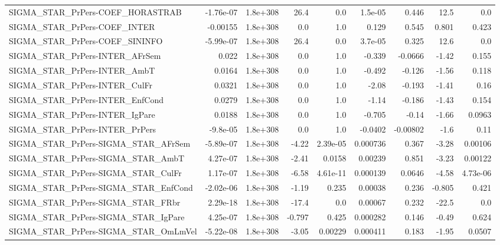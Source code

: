 \begin{tabular}{lrrrrrrrr}
SIGMA\_STAR\_PrPers-COEF\_HORASTRAB      &   -1.76e-07 &     1.8e+308 &    26.4 &      0.0 &    1.5e-05 &       0.446 &         12.5 &           0.0 \\
SIGMA\_STAR\_PrPers-COEF\_INTER          &    -0.00155 &     1.8e+308 &     0.0 &      1.0 &      0.129 &       0.545 &        0.801 &         0.423 \\
SIGMA\_STAR\_PrPers-COEF\_SININFO        &   -5.99e-07 &     1.8e+308 &    26.4 &      0.0 &    3.7e-05 &       0.325 &         12.6 &           0.0 \\
SIGMA\_STAR\_PrPers-INTER\_AFrSem        &       0.022 &     1.8e+308 &     0.0 &      1.0 &     -0.339 &     -0.0666 &        -1.42 &         0.155 \\
SIGMA\_STAR\_PrPers-INTER\_AmbT          &      0.0164 &     1.8e+308 &     0.0 &      1.0 &     -0.492 &      -0.126 &        -1.56 &         0.118 \\
SIGMA\_STAR\_PrPers-INTER\_CulFr         &      0.0321 &     1.8e+308 &     0.0 &      1.0 &      -2.08 &      -0.193 &        -1.41 &          0.16 \\
SIGMA\_STAR\_PrPers-INTER\_EnfCond       &      0.0279 &     1.8e+308 &     0.0 &      1.0 &      -1.14 &      -0.186 &        -1.43 &         0.154 \\
SIGMA\_STAR\_PrPers-INTER\_IgPare        &      0.0188 &     1.8e+308 &     0.0 &      1.0 &     -0.705 &       -0.14 &        -1.66 &        0.0963 \\
SIGMA\_STAR\_PrPers-INTER\_PrPers        &    -9.8e-05 &     1.8e+308 &     0.0 &      1.0 &    -0.0402 &    -0.00802 &         -1.6 &          0.11 \\
SIGMA\_STAR\_PrPers-SIGMA\_STAR\_AFrSem   &   -5.89e-07 &     1.8e+308 &   -4.22 & 2.39e-05 &   0.000736 &       0.367 &        -3.28 &       0.00106 \\
SIGMA\_STAR\_PrPers-SIGMA\_STAR\_AmbT     &    4.27e-07 &     1.8e+308 &   -2.41 &   0.0158 &    0.00239 &       0.851 &        -3.23 &       0.00122 \\
SIGMA\_STAR\_PrPers-SIGMA\_STAR\_CulFr    &    1.17e-07 &     1.8e+308 &   -6.58 & 4.61e-11 &   0.000139 &      0.0646 &        -4.58 &      4.73e-06 \\
SIGMA\_STAR\_PrPers-SIGMA\_STAR\_EnfCond  &   -2.02e-06 &     1.8e+308 &   -1.19 &    0.235 &    0.00038 &       0.236 &       -0.805 &         0.421 \\
SIGMA\_STAR\_PrPers-SIGMA\_STAR\_FRbr     &    2.29e-18 &     1.8e+308 &   -17.4 &      0.0 &    0.00067 &       0.232 &        -22.5 &           0.0 \\
SIGMA\_STAR\_PrPers-SIGMA\_STAR\_IgPare   &    4.25e-07 &     1.8e+308 &  -0.797 &    0.425 &   0.000282 &       0.146 &        -0.49 &         0.624 \\
SIGMA\_STAR\_PrPers-SIGMA\_STAR\_OmLmVel  &   -5.22e-08 &     1.8e+308 &   -3.05 &  0.00229 &   0.000411 &       0.183 &        -1.95 &        0.0507 \\
\bottomrule
\end{tabular}
